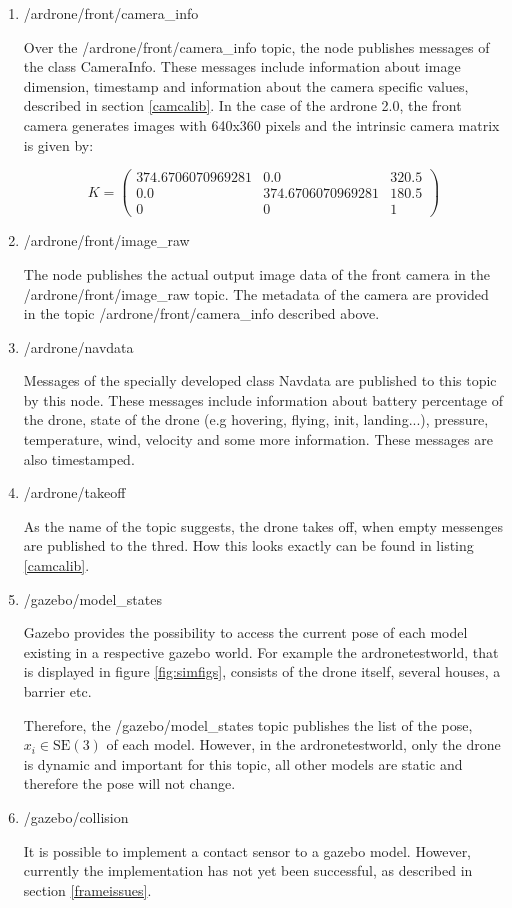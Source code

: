 	\begin{enumerate}
	
	\item{/ardrone/front/camera\_info}
	
	Over the /ardrone/front/camera\_info topic, the node publishes messages of the class CameraInfo. These messages include information about 
	image dimension, timestamp and information about the camera specific values, described in section \ref{camcalib}. In the case of the ardrone 2.0,
	the front camera generates images with 640x360 pixels and the intrinsic camera matrix is given by: 
	
	$$K = \begin{pmatrix} 374.6706070969281 & 0.0 & 320.5 \\
						  0.0 & 374.6706070969281 & 180.5 \\ 
						  0 & 0 & 1 \end{pmatrix}$$
	
	\item{/ardrone/front/image\_raw}
	
	The node publishes the actual output image data of the front camera in the /ardrone/front/image\_raw topic. The metadata of the camera are provided in the topic /ardrone/front/camera\_info described above. 
	
	\item{/ardrone/navdata}
	
	Messages of the specially developed class Navdata are published to this topic by this node. These messages include information about 
	battery percentage of the drone, state of the drone (e.g hovering, flying, init, landing...), pressure, temperature, wind, velocity and 
    some more information. These messages are also timestamped. 	
	
	\item{/ardrone/takeoff}
	
	As the name of the topic suggests, the drone takes off, when empty messenges are published to the thred. How this looks exactly can be found in 
	listing \ref{camcalib}.
	
	\item{/gazebo/model\_states}
	
	Gazebo provides the possibility to access the current pose of each model existing in a respective gazebo world. For example the ardronetestworld, 
	that is displayed in figure \ref{fig:simfigs}, consists of the drone itself, several houses, a barrier etc.
	
	Therefore, the /gazebo/model\_states topic 
	publishes the list of the pose, $x_i \in \text{SE}(3)$ of each model. However, in the ardronetestworld, only the drone is dynamic and important for this topic, all other models 
	are static and therefore the pose will not change. 
	
	\item{/gazebo/collision}
	
	It is possible to implement a contact sensor to a gazebo model.
	However, currently the implementation has not yet been successful, as described in section \ref{frameissues}. 
	
	\end{enumerate}
	
